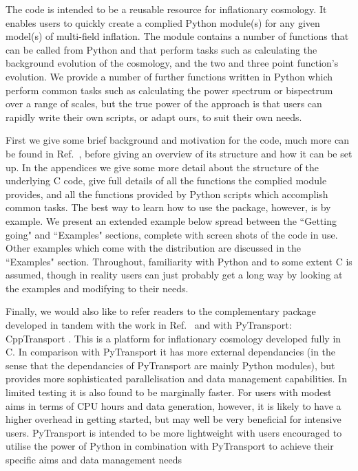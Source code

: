 \documentclass[10pt,
amsmath,amssymb,
aps,prd,nofootinbib,eqsecnum,a4paper]{revtex4}
\newcommand{\CC}{C\nolinebreak\hspace{-.05em}\raisebox{.4ex}{\tiny\bf +}\nolinebreak\hspace{-.10em}\raisebox{.4ex}{\tiny\bf +}}
\def\CC{{C\nolinebreak[4]\hspace{-.05em}\raisebox{.4ex}{\tiny\bf ++}}}
\def\S{ }
\begin{document}
The code is intended to be a reusable resource for inflationary cosmology. It enables users to quickly create a 
complied Python module(s) for any given model(s) of multi-field inflation. The module contains a number of
functions that can be called from Python and that perform tasks such as calculating the background evolution 
of the cosmology, and the two and three point function's evolution. We provide a number of further functions written in 
Python which perform common tasks such as calculating the power spectrum or bispectrum over a range of scales, 
but the true power of the approach is that users can rapidly write their own scripts, or adapt ours, to suit their own needs. 

First we give some brief background and motivation for the code, much more can be found in Ref.~\cite{xxx}, 
before giving an overview of its structure and how 
it can be set up. In the appendices we give some more detail about the structure of the underlying \CC \S code,  
give full details of all the functions the complied module provides, and all the functions provided by 
Python scripts which accomplish common tasks. The best way to learn how to use the package, however, is 
by example. We present an extended example below spread between the ``Getting going"  and ``Examples" sections, 
complete with screen shots of the code in use. 
Other examples which come with the distribution are discussed in the ``Examples" section.
Throughout, familiarity with Python and to some extent \CC \S  is assumed, though in reality users 
can just probably get a long way by looking at the examples and modifying to their needs. 



Finally, we would also like to refer readers to the complementary package developed 
in tandem with the work in Ref.~\cite{xxx} and with PyTransport: CppTransport \cite{xxx2}. This is a platform for inflationary 
cosmology developed fully in \CC. In comparison with PyTransport it  has 
more external dependancies (in the sense that the dependancies of PyTransport are mainly 
Python modules), but provides more sophisticated parallelisation and data management capabilities. 
In limited testing it is also found to be marginally faster.
For users with modest aims in terms of CPU hours and data generation, however, it is likely to have a higher 
overhead 
in getting started, but may well be very beneficial for intensive users. PyTransport 
is intended to be more lightweight with users encouraged to utilise the power of Python in combination 
with PyTransport to achieve their specific aims and data management needs
\end{document}
